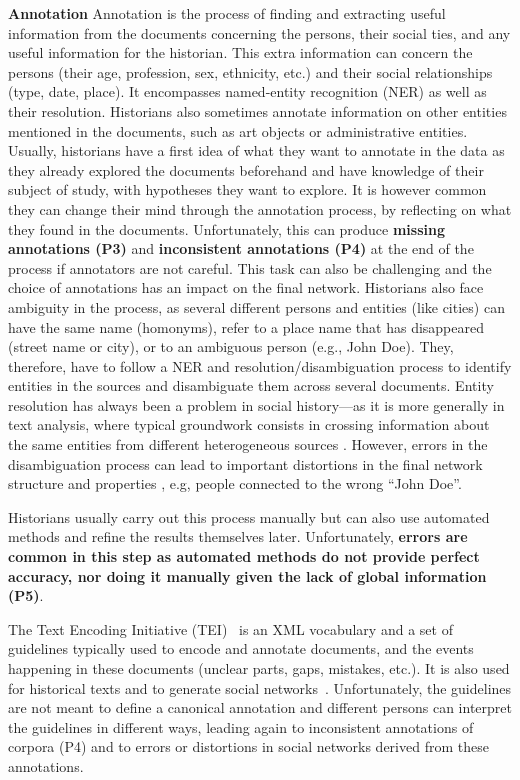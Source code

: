 \noindent\textbf{Annotation}
Annotation is the process of finding and extracting useful information from the documents concerning the persons, their social ties, and any useful information for the historian. This extra information can concern the persons (their age, profession, sex, ethnicity, etc.) and their social relationships (type, date, place). It encompasses named-entity recognition (NER) as well as their resolution.
Historians also sometimes annotate information on other entities mentioned in the documents, such as art objects or administrative entities.
Usually, historians have a first idea of what they want to annotate in the data as they already explored the documents beforehand and have knowledge of their subject of study, with hypotheses they want to explore. It is however common they can change their mind through the annotation process, by reflecting on what they found in the documents. Unfortunately, this can produce \textbf{missing annotations (P3)} and \textbf{inconsistent annotations (P4)} at the end of the process if annotators are not careful.
This task can also be challenging and the choice of annotations has an impact on the final network. Historians also face ambiguity in the process, as several different persons and entities (like cities) can have the same name (homonyms), refer to a place name that has disappeared (street name or city), or to an ambiguous person (e.g., John Doe). They, therefore, have to follow a NER and resolution/disambiguation process to identify entities in the sources and disambiguate them across several documents. Entity resolution has always been a problem in social history---as it is more generally in text analysis, where typical groundwork consists in crossing information about the same entities from different heterogeneous sources \cite{andrei2011porgy}. However, errors in the disambiguation process can lead to important distortions in the final network structure and properties \cite{diesnerImpactEntityDisambiguation2015}, e.g, people connected to the wrong ``John Doe''.

Historians usually carry out this process manually but can also use automated methods and refine the results themselves later. Unfortunately, \textbf{errors are common in this step as automated methods do not provide perfect accuracy, nor doing it manually given the lack of global information (P5)}.

The Text Encoding Initiative (TEI)~\cite{TEI} is an XML vocabulary and a set of guidelines typically used to encode and annotate documents, and the events happening in these documents (unclear parts, gaps, mistakes, etc.). It is also used for historical texts and to generate social networks~\cite{dufournaud:hal-00876586, vistorian_mini_questionnaires}. Unfortunately, the guidelines are not meant to define a canonical annotation and different persons can interpret the guidelines in different ways, leading again to inconsistent annotations of corpora (P4) and to errors or distortions in social networks derived from these annotations.

